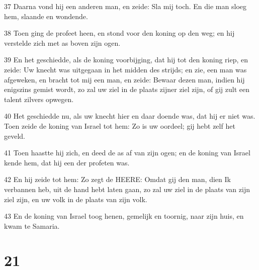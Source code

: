 \par 37 Daarna vond hij een anderen man, en zeide: Sla mij toch. En die man sloeg hem, slaande en wondende.
\par 38 Toen ging de profeet heen, en stond voor den koning op den weg; en hij verstelde zich met as boven zijn ogen.
\par 39 En het geschiedde, als de koning voorbijging, dat hij tot den koning riep, en zeide: Uw knecht was uitgegaan in het midden des strijds; en zie, een man was afgeweken, en bracht tot mij een man, en zeide: Bewaar dezen man, indien hij enigszins gemist wordt, zo zal uw ziel in de plaats zijner ziel zijn, of gij zult een talent zilvers opwegen.
\par 40 Het geschiedde nu, als uw knecht hier en daar doende was, dat hij er niet was. Toen zeide de koning van Israel tot hem: Zo is uw oordeel; gij hebt zelf het geveld.
\par 41 Toen haastte hij zich, en deed de as af van zijn ogen; en de koning van Israel kende hem, dat hij een der profeten was.
\par 42 En hij zeide tot hem: Zo zegt de HEERE: Omdat gij den man, dien Ik verbannen heb, uit de hand hebt laten gaan, zo zal uw ziel in de plaats van zijn ziel zijn, en uw volk in de plaats van zijn volk.
\par 43 En de koning van Israel toog henen, gemelijk en toornig, naar zijn huis, en kwam te Samaria.

\chapter{21}

